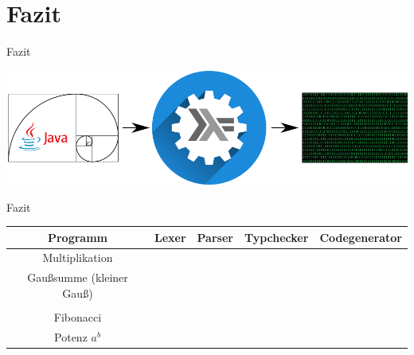 \section{Fazit}

\begin{frame}{Fazit}

\begin{center}
	\includegraphics{images/fazit/fazit.png}
\end{center}

\end{frame}

\begin{frame}{Fazit}

\begin{center}
	\begin{tabular}{|c|c|c|c|c|}
		\hline
		Programm & Lexer & Parser & Typchecker & Codegenerator \\
		\hline
		Multiplikation & \checkmark & \checkmark & \checkmark & \checkmark \\
		\hline
		Gaußsumme (kleiner Gauß) & \checkmark & \checkmark & \checkmark & \checkmark \\
		\hline
		\text{Fakultät} & \checkmark & \checkmark & \checkmark & \checkmark \\
		\hline
		Fibonacci & \checkmark & \checkmark & \checkmark & \checkmark \\
		\hline
		Potenz $ a^{b} $ & \checkmark & \checkmark & \checkmark & \checkmark\\
		\hline
	\end{tabular}
\end{center}


\end{frame}